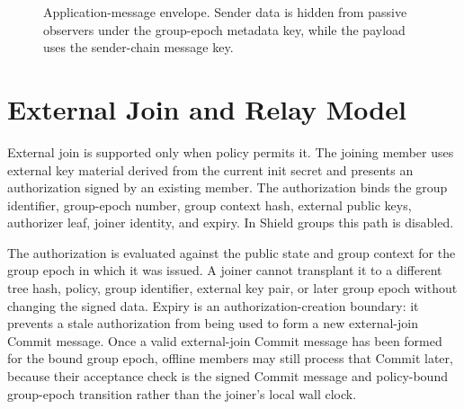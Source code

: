 \documentclass[preprint,12pt]{elsarticle}
\theoremstyle{definition}
\newcommand{\tech}[1]{\textnormal{#1}}
\newcommand{\Shield}{\tech{Shield}}
\begin{document}
\begin{figure}[tbp]
\centering
{}
\caption{Application-message envelope. Sender data is hidden from passive
observers under the group-epoch metadata key, while the payload uses the sender-chain
message key.}
\label{fig:message-envelope}
\end{figure}

\section{External Join and Relay Model}

External join is supported only when policy permits it. The joining member
uses external key material derived from the current init secret and presents an
authorization signed by an existing member. The authorization binds the group
identifier, group-epoch number, group context hash, external public keys, authorizer leaf,
joiner identity, and expiry. In \Shield{} groups this path is disabled.

The authorization is evaluated against the public state and group context for
the group epoch in which it was issued. A joiner cannot transplant it to a different
tree hash, policy, group identifier, external key pair, or later group epoch without
changing the signed data. Expiry is an authorization-creation boundary: it
prevents a stale authorization from being used to form a new external-join
Commit message. Once a valid external-join Commit message has been formed for the bound group epoch,
offline members may still process that Commit later, because their acceptance
check is the signed Commit message and policy-bound group-epoch transition rather than the
joiner's local wall clock.
\end{document}
